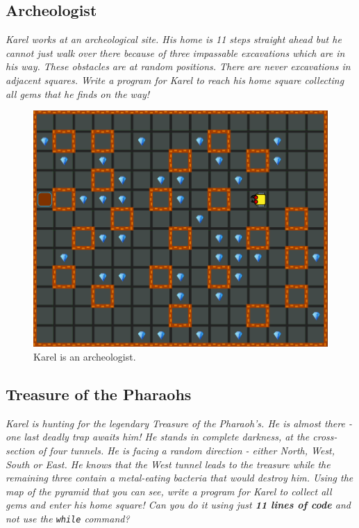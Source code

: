 \subsection{Archeologist}

{\em Karel works at an archeological site. His home is 11 steps straight ahead but he cannot just walk over there because of three impassable excavations which are in his way. These obstacles are at random positions. There are never excavations in adjacent squares. Write a program for Karel to reach his home square collecting all gems that he finds on the way!}\\[-7mm]

\begin{figure}[!ht]
\begin{center}
\includegraphics[height=0.4\textwidth]{img/d03.png}
\end{center}
\vspace{-4mm}
\caption{Karel is an archeologist.}
\label{fig:d03}
\vspace{-10mm}
\end{figure}


\subsection{Treasure of the Pharaohs}

{\em Karel is hunting for the legendary Treasure of the Pharaoh's. He is almost there - one last deadly trap awaits him! He stands in complete darkness, at the cross-section of four tunnels. He is facing a random direction - either North, West, South or East. He knows that the West tunnel leads to the treasure while the remaining three contain a metal-eating bacteria that would destroy him. Using the map of the pyramid that you can see, write a program for Karel to collect all gems and enter his home square! Can you do it using just {\bf 11 lines of code} and not use the {\tt while} command?}
\newpage


